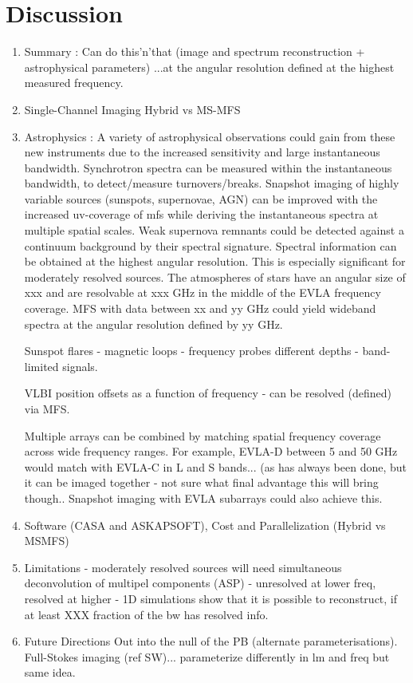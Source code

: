 \documentclass[structabstract]{stylefiles/aa}
\begin{document}
\section{Discussion}\label{Sec:CONCLUSIONS}
\begin{enumerate}
\item { Summary : Can do this'n'that (image and spectrum reconstruction + astrophysical parameters)}
...at the angular resolution defined at the highest measured frequency.
\item Single-Channel Imaging Hybrid vs MS-MFS
\item Astrophysics : A variety of astrophysical observations could gain from these new instruments due to the 
increased sensitivity and large instantaneous bandwidth. Synchrotron spectra can be measured
within the instantaneous bandwidth, to detect/measure turnovers/breaks.
Snapshot imaging of highly variable sources 
(sunspots, supernovae, AGN) can be improved with the increased uv-coverage of mfs while
deriving the instantaneous spectra at multiple spatial scales.
Weak supernova remnants could be detected against a continuum background by their spectral signature.
Spectral information can be obtained at the highest angular resolution. This is especially 
significant for moderately resolved sources. 
The atmospheres of stars have an angular size of xxx and are resolvable at xxx GHz in the middle
of the EVLA frequency coverage. MFS with data between xx and yy GHz could yield wideband spectra
at the angular resolution defined by yy GHz.

Sunspot flares - magnetic loops - frequency probes different depths - band-limited signals.

VLBI position offsets as a function of frequency - can be resolved (defined) via MFS.

Multiple arrays can be combined by matching spatial frequency coverage across wide frequency ranges.
For example, EVLA-D between 5 and 50 GHz would match with EVLA-C in L and S bands... (as has always
been done, but it can be imaged together - not sure what final advantage this will bring though..
Snapshot imaging with EVLA subarrays could also achieve this.

\item Software (CASA and ASKAPSOFT), Cost and Parallelization (Hybrid vs MSMFS)
\item { Limitations }
- moderately resolved sources will need simultaneous deconvolution of multipel components (ASP)
- unresolved at lower freq, resolved at higher - 1D simulations show that it is possible to reconstruct, if at least XXX fraction of the bw has resolved info.
\item { Future Directions }
Out into the null of the PB (alternate parameterisations).
Full-Stokes imaging (ref SW)... parameterize differently in lm and freq but same idea.
\end{enumerate}
\end{document}
